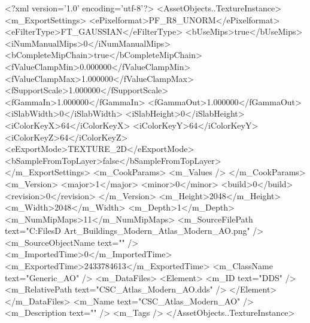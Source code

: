 <?xml version='1.0' encoding='utf-8'?>
<AssetObjects..TextureInstance>
  <m_ExportSettings>
    <ePixelformat>PF_R8_UNORM</ePixelformat>
    <eFilterType>FT_GAUSSIAN</eFilterType>
    <bUseMips>true</bUseMips>
    <iNumManualMips>0</iNumManualMips>
    <bCompleteMipChain>true</bCompleteMipChain>
    <fValueClampMin>0.000000</fValueClampMin>
    <fValueClampMax>1.000000</fValueClampMax>
    <fSupportScale>1.000000</fSupportScale>
    <fGammaIn>1.000000</fGammaIn>
    <fGammaOut>1.000000</fGammaOut>
    <iSlabWidth>0</iSlabWidth>
    <iSlabHeight>0</iSlabHeight>
    <iColorKeyX>64</iColorKeyX>
    <iColorKeyY>64</iColorKeyY>
    <iColorKeyZ>64</iColorKeyZ>
    <eExportMode>TEXTURE_2D</eExportMode>
    <bSampleFromTopLayer>false</bSampleFromTopLayer>
  </m_ExportSettings>
  <m_CookParams>
    <m_Values />
  </m_CookParams>
  <m_Version>
    <major>1</major>
    <minor>0</minor>
    <build>0</build>
    <revision>0</revision>
  </m_Version>
  <m_Height>2048</m_Height>
  <m_Width>2048</m_Width>
  <m_Depth>1</m_Depth>
  <m_NumMipMaps>11</m_NumMipMaps>
  <m_SourceFilePath text="C:\Users\Shadow\Desktop\Working Files\3D Art\Textures\CSC_Buildings_Modern\Current\textures\CSC_Atlas_Modern_AO.png" />
  <m_SourceObjectName text="" />
  <m_ImportedTime>0</m_ImportedTime>
  <m_ExportedTime>2433784613</m_ExportedTime>
  <m_ClassName text="Generic_AO" />
  <m_DataFiles>
    <Element>
      <m_ID text="DDS" />
      <m_RelativePath text="CSC_Atlas_Modern_AO.dds" />
    </Element>
  </m_DataFiles>
  <m_Name text="CSC_Atlas_Modern_AO" />
  <m_Description text="" />
  <m_Tags />
</AssetObjects..TextureInstance>
